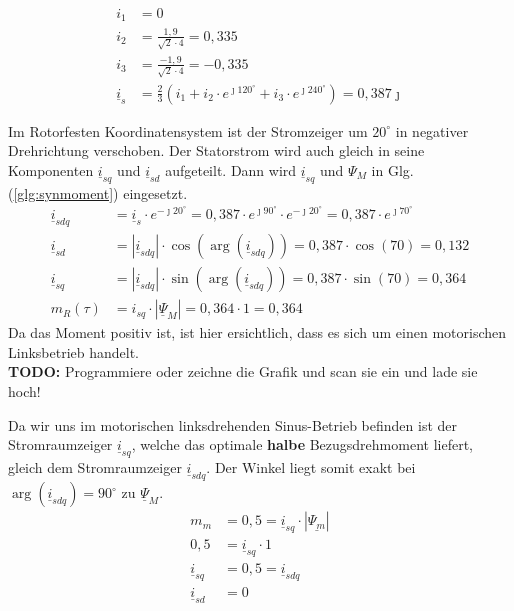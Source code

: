 \begin{solution}
\begin{compactenum}
\item 
\begin{align}
i_1 &= 0\\
i_2 &= \frac{1,9}{\sqrt{2} \cdot 4}= 0,335\\
i_3 &= \frac{-1,9}{\sqrt{2} \cdot 4}= -0,335\\
\underline{i}_s &= \frac{2}{3} \left ( i_1 + i_2 \cdot e^{\jmath 120^\circ} + i_3 \cdot e^{\jmath 240^\circ}  \right ) = 0,387 \jmath
\end{align}
\item Im Rotorfesten Koordinatensystem ist der Stromzeiger um $20^\circ$ in negativer Drehrichtung verschoben. Der Statorstrom wird auch gleich in seine Komponenten $\underline{i}_{sq}$ und $\underline{i}_{sd}$ aufgeteilt. Dann wird $\underline{i}_{sq}$ und $\Psi_M$ in Glg.(\ref{glg:synmoment}) eingesetzt.
\begin{align}
\underline{i}_{sdq} & = \underline{i}_s \cdot e^{-\jmath 20 ^\circ} = 0,387 \cdot e^{\jmath 90 ^\circ} \cdot e^{-\jmath 20 ^\circ} = 0,387 \cdot e^{\jmath 70 ^\circ} \\
\underline{i}_{sd} & = |\underline{i}_{sdq}| \cdot \cos(\arg(\underline{i}_{sdq})) = 0,387 \cdot \cos(70) = 0,132 \\
\underline{i}_{sq} & = |\underline{i}_{sdq}| \cdot \sin(\arg(\underline{i}_{sdq})) = 0,387 \cdot \sin(70) = 0,364 \\
m_R(\tau)& =  i_{sq} \cdot | \underline{\Psi}_M|= 0,364\cdot 1 = 0,364
\end{align}
Da das Moment positiv ist, ist hier ersichtlich, dass es sich um einen motorischen Linksbetrieb handelt.\\
\textbf{TODO:} Programmiere oder zeichne die Grafik und scan sie ein und lade sie hoch!
\item Da wir uns im motorischen linksdrehenden Sinus-Betrieb befinden ist der Stromraumzeiger $\underline{i}_{sq}$, welche das optimale \textbf{halbe} Bezugsdrehmoment liefert, gleich dem Stromraumzeiger $\underline{i}_{sdq}$. Der Winkel liegt somit exakt bei $\arg(\underline{i}_{sdq})=90^\circ$ zu $\underline{\Psi}_M$.
\begin{align}
m_m &= 0,5 = \underline{i}_{sq} \cdot |\underline{\Psi_m}|\\
0,5 &= \underline{i}_{sq} \cdot 1\\
\underline{i}_{sq} &= 0,5 = \underline{i}_{sdq} \\
\underline{i}_{sd} &= 0\\

\end{align}
\end{compactenum}
\end{solution}
